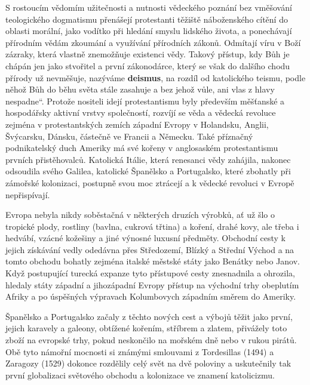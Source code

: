      S rostoucím vědomím užitečnosti a nutnosti vědeckého poznání bez vměšování teologického
      dogmatismu přenášejí protestanti těžiště náboženského cítění do oblasti morální, jako vodítko
      při hledání smyslu lidského života, a ponechávají přírodním vědám zkoumání a využívání
      přírodních zákonů. Odmítají víru v Boží zázraky, která vlastně znemožňuje existenci vědy.
      Takový přístup, kdy Bůh je chápán jen jako stvořitel a první zákonodárce, který se však do
      dalšího chodu přírody už nevměšuje, nazýváme \textbf{deismus}, na rozdíl od katolického
      teismu, podle něhož Bůh do běhu světa stále zasahuje a bez jehož vůle, ani vlas z hlavy
      nespadne“. Protože nositeli idejí protestantismu byly především měšťanské a hospodářsky
      aktivní vrstvy společností, rozvíjí se věda a vědecká revoluce zejména v protestantských
      zemích západní Evropy v Holandsku, Anglii, Švýcarsku, Dánsku, částečně ve Francii a Německu.
      Také příznačný podnikatelský duch Ameriky má své kořeny v anglosaském protestantismu prvních
      přistěhovalců. Katolická Itálie, která renesanci vědy zahájila, nakonec odsoudila svého
      Galilea, katolické Španělsko a Portugalsko, které zbohatly při zámořské kolonizaci, postupně
      svou moc ztrácejí a k vědecké revoluci v Evropě nepřispívají.

      Evropa nebyla nikdy soběstačná v některých druzích výrobků, ať už šlo o tropické plody,
      rostliny (bavlna, cukrová třtina) a koření, drahé kovy, ale třeba i hedvábí, vzácné kožešiny a
      jiné výnosné luxusní předměty. Obchodní cesty k jejich získávání vedly odedávna přes
      Středozemí, Blízký a Střední Východ a na tomto obchodu bohatly zejména italské městské státy
      jako Benátky nebo Janov. Když postupující turecká expanze tyto přístupové cesty znesnadnila a
      ohrozila, hledaly státy západní a jihozápadní Evropy přístup na východní trhy obeplutím Afriky
      a po úspěšných výpravach Kolumbovych západním směrem do Ameriky.

      Španělsko a Portugalsko začaly z těchto nových cest a výbojů těžit jako první, jejich karavely
      a galeony, obtížené kořením, stříbrem a zlatem, přivážely toto zboží na evropské trhy, pokud
      neskončilo na mořském dně nebo v rukou pirátů. Obě tyto námořní mocnosti si známými smlouvami
      z Tordesillas (1494) a Zaragozy (1529) dokonce rozdělily celý svět na dvě poloviny a
      uskutečnily tak první globalizaci světového obchodu a kolonizace ve znamení katolicizmu.

